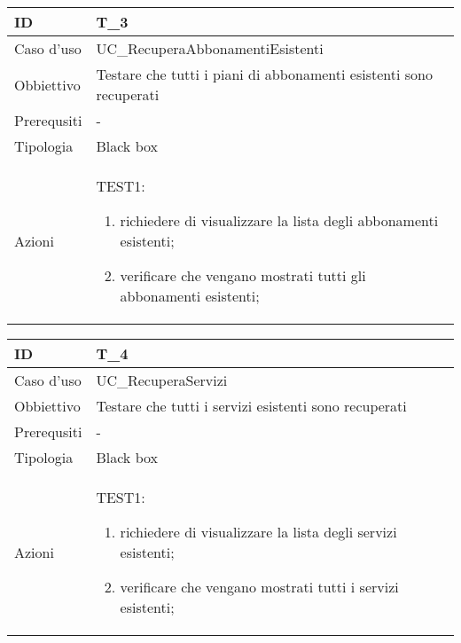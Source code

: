 \begin{table}[hb]
    \centering
    \begin{tabular}{ |p{2cm}|p{10cm}|  }
        \hline
        ID & T\_3 \\\hline
        Caso d'uso & UC\_RecuperaAbbonamentiEsistenti \\\hline   
        Obbiettivo & Testare che tutti i piani di abbonamenti esistenti sono recuperati \\\hline
        Prerequsiti & - \\\hline
        Tipologia & Black box \\\hline
        Azioni & 
        TEST1:
        \begin{enumerate}[topsep=0pt]
            \item richiedere di visualizzare la lista degli abbonamenti esistenti;
            \item verificare che vengano mostrati tutti gli abbonamenti esistenti;
        \end{enumerate}
        \\\hline
    \end{tabular}
\end{table}

\begin{table}[hb]
    \centering
    \begin{tabular}{ |p{2cm}|p{10cm}|  }
        \hline
        ID & T\_4 \\\hline
        Caso d'uso & UC\_RecuperaServizi \\\hline   
        Obbiettivo & Testare che tutti i servizi esistenti sono recuperati \\\hline
        Prerequsiti & - \\\hline
        Tipologia & Black box \\\hline
        Azioni & 
        TEST1:
        \begin{enumerate}[topsep=0pt]
            \item richiedere di visualizzare la lista degli servizi esistenti;
            \item verificare che vengano mostrati tutti i servizi esistenti;
        \end{enumerate}
        \\\hline
    \end{tabular}
\end{table}


